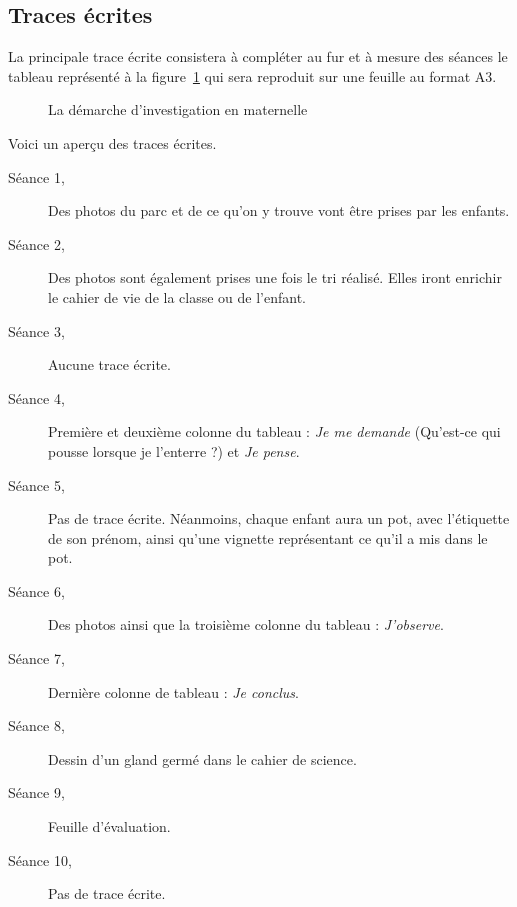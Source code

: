 \subsection{Traces écrites}
La principale trace écrite consistera à compléter au fur et à mesure des séances le tableau représenté à la figure~\ref{te} qui sera reproduit sur une feuille au format A3.

\newcommand{\echelle}{.985}
\begin{figure}[h!tbp]
\centering
\noindent{}
\caption{La démarche d’investigation en maternelle}
\label{te}
\end{figure}

Voici un aperçu des traces écrites.
\begin{description}
\item[Séance 1, \og \seancei \fg{}] Des photos du parc et de ce qu’on y trouve vont être prises par les enfants.
\item[Séance 2, \og \seanceii \fg{}] Des photos sont également prises une fois le tri réalisé. Elles iront enrichir le cahier de vie de la classe ou de l’enfant.
\item[Séance 3, \og \seanceiii \fg{}] Aucune trace écrite.
\item[Séance 4, \og \seanceiv \fg{}] Première et deuxième colonne du tableau : \textit{Je me demande} (Qu’est-ce qui pousse lorsque je l’enterre ?) et \textit{Je pense}.
\item[Séance 5, \og \seancev \fg{}] Pas de trace écrite. Néanmoins, chaque enfant aura un pot, avec l’étiquette de son prénom, ainsi qu’une vignette représentant ce qu’il a mis dans le pot.
\item[Séance 6, \og \seancevi \fg{}] Des photos ainsi que la troisième colonne du tableau : \emph{J’observe}.
\item[Séance 7, \og \seancevii \fg{}] Dernière colonne de tableau : \emph{Je conclus}.
\item[Séance 8, \og \seanceviii \fg{}] Dessin d’un gland germé dans le cahier de science.
\item[Séance 9, \og \seanceix \fg{}] Feuille d’évaluation.
\item[Séance 10, \og \seancex \fg{}] Pas de trace écrite.
\end{description}